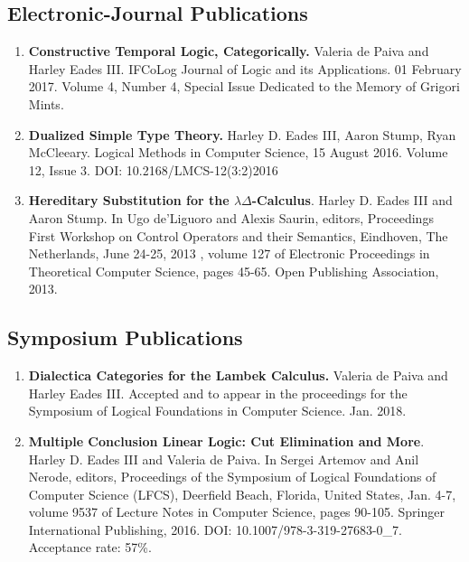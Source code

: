 \documentclass{article}
\begin{document}
  \subsection{Electronic-Journal Publications}

  \begin{enumerate}
  \item \textbf{Constructive Temporal Logic, Categorically.} Valeria
    de Paiva and Harley Eades III.  IFCoLog Journal of Logic and its
    Applications. 01 February 2017. Volume 4, Number 4, Special Issue
    Dedicated to the Memory of Grigori Mints.

  \item \textbf{Dualized Simple Type Theory.} Harley D. Eades III, Aaron
    Stump, Ryan McCleeary. Logical Methods in Computer Science, 15
    August 2016. Volume 12, Issue 3. DOI: 10.2168/LMCS-12(3:2)2016

  \item \textbf{Hereditary Substitution for the
    $\lambda\Delta$-Calculus}.  Harley D. Eades III and Aaron Stump.
    In Ugo de'Liguoro and Alexis Saurin, editors, Proceedings First
    Workshop on Control Operators and their Semantics, Eindhoven, The
    Netherlands, June 24-25, 2013 , volume 127 of Electronic
    Proceedings in Theoretical Computer Science, pages 45-65. Open
    Publishing Association, 2013.

  \end{enumerate}

  \subsection{Symposium Publications}
  \label{subsec:symposium_publications}
  \begin{enumerate}
  \item \textbf{Dialectica Categories for the Lambek Calculus.}
    Valeria de Paiva and Harley Eades III. Accepted and to appear in
    the proceedings for the Symposium of Logical Foundations in
    Computer Science. Jan. 2018.

  \item \textbf{Multiple Conclusion Linear Logic: Cut Elimination and
    More}.  Harley D. Eades III and Valeria de Paiva. In Sergei Artemov
    and Anil Nerode, editors, Proceedings of the Symposium of Logical
    Foundations of Computer Science (LFCS), Deerfield Beach, Florida,
    United States, Jan. 4-7, volume 9537 of Lecture Notes in Computer
    Science, pages 90-105. Springer International Publishing,
    2016. DOI: 10.1007/978-3-319-27683-0\_7.  Acceptance rate: 57\%.
  \end{enumerate}
  
\end{document}
